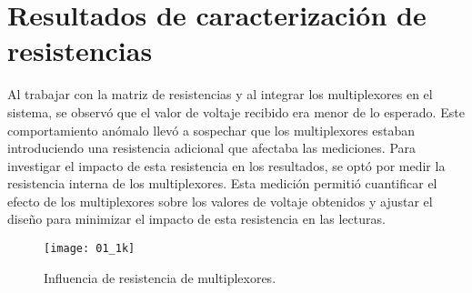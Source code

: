 \section{Resultados de caracterización de resistencias}  
Al trabajar con la matriz de resistencias y al integrar los multiplexores en el sistema, se observó que el valor de voltaje recibido era menor de lo esperado. Este comportamiento anómalo llevó a sospechar que los multiplexores estaban introduciendo una resistencia adicional que afectaba las mediciones. Para investigar el impacto de esta resistencia en los resultados, se optó por medir la resistencia interna de los multiplexores. Esta medición permitió cuantificar el efecto de los multiplexores sobre los valores de voltaje obtenidos y ajustar el diseño para minimizar el impacto de esta resistencia en las lecturas.
            \begin{table}[htbp]
                \caption{Resistencia de multiplexores.}
                \begin{center}
                \label{tab:Mux_res}
                \end{center}
            \end{table}

            \begin{figure}[hbtp]
                \centering
                \texttt{[image: 01\_1k]}
                \caption{Influencia de resistencia de multiplexores.}
                \label{fig:01_1k}
            \end{figure}  
            
